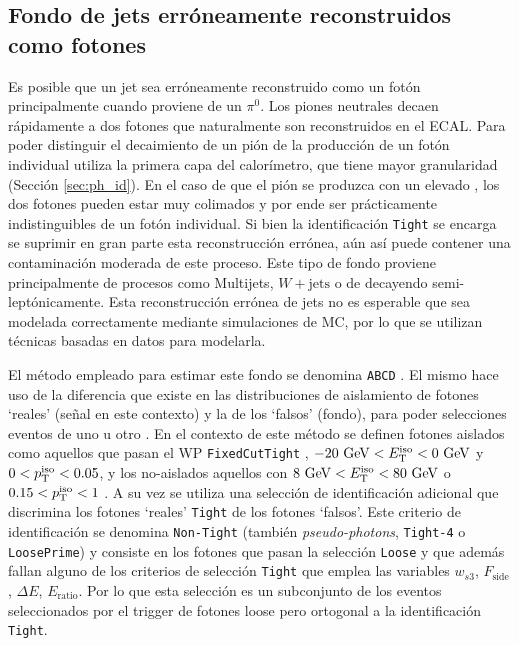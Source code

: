 \subsection{Fondo de jets erróneamente reconstruidos como fotones}

Es posible que un jet sea erróneamente reconstruido como un fotón principalmente cuando proviene de un $\pi^0$. Los piones neutrales decaen rápidamente a dos fotones que naturalmente son reconstruidos en el ECAL. Para poder distinguir el decaimiento de un pión de la producción de un fotón individual utiliza la primera capa del calorímetro, que tiene mayor granularidad (Sección \ref{sec:ph_id}). En el caso de que el pión se produzca con un elevado \pt, los dos fotones pueden estar muy colimados y por ende ser prácticamente indistinguibles de un fotón individual. Si bien la identificación \texttt{Tight} se encarga se suprimir en gran parte esta reconstrucción errónea, aún así puede contener una contaminación moderada de este proceso. Este tipo de fondo proviene principalmente de procesos como Multijets, $W+\text{jets}$ o de \ttbar decayendo semi-leptónicamente. Esta reconstrucción errónea de jets no es esperable que sea modelada correctamente mediante simulaciones de MC, por lo que se utilizan técnicas basadas en datos para modelarla.

El método empleado para estimar este fondo se denomina \texttt{ABCD} \cite{Alonso:2233238}. El mismo hace uso de la diferencia que existe en las distribuciones de aislamiento de fotones `reales' (señal en este contexto) y la de los `falsos' (fondo), para poder selecciones eventos de uno u otro . En el contexto de este método se definen fotones aislados como aquellos que pasan el WP \texttt{FixedCutTight} , $-20\ \gev<\ETiso<0\ \gev$ y $0<p_{\text{T}}^{\text{iso}}<0.05$, y los no-aislados aquellos con $8\ \gev<\ETiso<80\ \gev$ o $0.15<p_{\text{T}}^{\text{iso}}<1$ . A su vez se utiliza una selección de identificación adicional que discrimina los fotones `reales' \texttt{Tight} de los fotones `falsos'. Este criterio de identificación se denomina \texttt{Non-Tight} (también \textit{pseudo-photons}, \texttt{Tight-4} o \texttt{LoosePrime}) y consiste en los fotones que pasan la selección \texttt{Loose} y que además fallan alguno de los criterios de selección \texttt{Tight} que emplea las variables $w_{s3}$, $F_{\text{side}}$, $\Delta E$, $E_{\text{ratio}}$. Por lo que esta selección es un subconjunto de los eventos seleccionados por el trigger de fotones loose pero ortogonal a la identificación \texttt{Tight}. 

